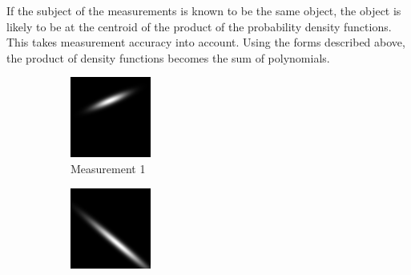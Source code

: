 \documentclass[a4paper, 11pt, titlepage]{article}
\begin{document}
        If the subject of the measurements is known to be the same object, the object is likely to be at the centroid of the product of the probability density functions.  This takes measurement accuracy into account.
        Using the forms described above, the product of density functions becomes the sum of polynomials.
        \begin{figure}
        \centering
        \begin{subfigure}{.33\textwidth}
          \centering
          \includegraphics[width=.9\linewidth]{images/GaussianLine1.png}
          \caption{Measurement 1}
          \label{fig:uncProdsub1}
        \end{subfigure}%
        \begin{subfigure}{.33\textwidth}
          \centering
          \includegraphics[width=.9\linewidth]{images/GaussianLine2.png}

\end{subfigure}
\end{figure}
\end{document}
